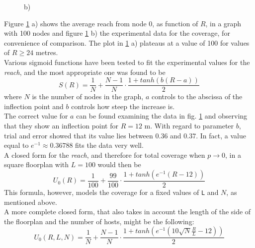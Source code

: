 \begin{figure}[H]
\begin{minipage}{.5\textwidth}
		\begin{center}
            b)
        \end{center}
	\end{minipage}
	\caption{}
    \label{fig:reachR30}
\end{figure}
\hfill \break
\hfill \break
Figure \ref{fig:reachR30} a) shows the average reach from node 0, as function of $R$, in a graph with 100 nodes and figure \ref{fig:reachR30} b) the experimental data for the coverage, for convenience of comparison. The plot in \ref{fig:reachR30} a)  plateaus at a value of 100 for values of $R \geq24$ metres. \\
Various sigmoid functions have been tested to fit the experimental values for the \textit{reach}, and the most appropriate one was found to be
\hfill \break
\begin{equation}\label{eq:reachSigmoidParametric}
	S(R) = \frac{1}{N} + \frac{N-1}{N}\cdot\frac{1+tanh(b(R-a))}{2}
\end{equation}
\hfill \break
where $N$ is the number of nodes in the graph, $a$ controls to the abscissa of the inflection point and $b$ controls how steep the increase is.\\
The correct value for $a$ can be found examining the data in fig. \ref{fig:reachR30} and observing that they show an inflection point for $R=12$ m. With regard to parameter $b$, trial and error showed that its value lies between $0.36$ and $0.37$. In fact, a value equal to $e^{-1} \approx 0.36788$ fits the data very well.\\
A closed form for the \textit{reach}, and therefore for total coverage when $p \to 0$, in a square floorplan with $L=100$ would then be
\hfill \break
\begin{equation}\label{eq:reachSigmoidNoL}
	U_{0}(R) = \frac{1}{100} + \frac{99}{100}\cdot\frac{1+tanh(e^{-1}(R - 12))}{2}
\end{equation}
\hfill \break
This formula, however, models the coverage for a fixed values of \texttt{L} and $N$, as mentioned above.\\
A more complete closed form, that also takes in account the length of the side of the floorplan and the number of hosts, might be the following:
\hfill \break
\begin{equation}\label{eq:reachSigmoidL}
	U_{0}(R, L, N) = \frac{1}{N} + \frac{N-1}{N}\cdot\frac{1+tanh(e^{-1}(10\sqrt{N}\frac{R}{L} - 12))}{2}
\end{equation}
\hfill \break
